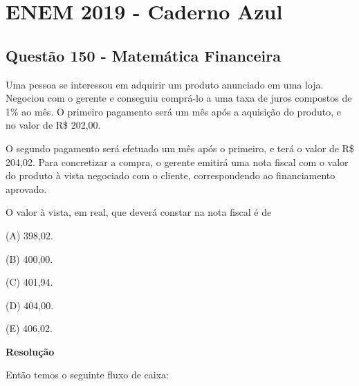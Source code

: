 \chapter{ENEM 2019 - Caderno Azul}

\section{Questão 150 - Matemática Financeira}

Uma pessoa se interessou em adquirir um produto anunciado em uma loja. Negociou com o gerente e conseguiu comprá-lo a uma taxa de juros compostos de 1\% ao mês. O primeiro pagamento será um mês após a aquisição do produto, e no valor de R\$ 202,00.

O segundo pagamento será efetuado um mês após o primeiro, e terá o valor de R\$ 204,02. Para concretizar a compra, o gerente emitirá uma nota fiscal com o valor do produto à vista negociado com o cliente, correspondendo ao financiamento aprovado.

O valor à vista, em real, que deverá constar na nota fiscal é de

(A) 398,02.

(B) 400,00.

(C) 401,94.

(D) 404,00.

(E) 406,02.

\textbf{Resolução}

Então temos o seguinte fluxo de caixa:

